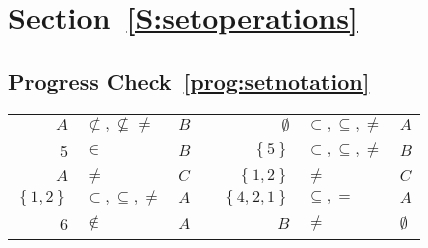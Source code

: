 \section*{Section~\ref{S:setoperations}}

\subsection*{Progress Check~\ref{prog:setnotation}}
\begin{center}
\begin{tabular}{r p{0.8in} l p{0.5in} r p{0.8in} l }
  $A$   & $\not \subset, \not \subseteq \ne$  & $B$   &   & $\emptyset$   & $\subset, \subseteq, \ne$  & $A$ \\ \cline{2-2} \cline{6-6}
   5    & $\in$  & $B$   &   &  $\left\{ 5 \right\}$     & $\subset, \subseteq, \ne$ &  $B$ \\ \cline{2-2} \cline{6-6}
  $A$   & $\ne$  & $C$   &   &  $\left\{ {1,2} \right\}$  & $\ne$  &  $C$ \\ \cline{2-2} \cline{6-6}
  $\left\{ {1,2} \right\}$ & $\subset, \subseteq, \ne$ &  $A$ &  &  $\left\{ {4,2,1} \right\}$ & 
$\subseteq, =$ & $A$ \\ \cline{2-2} \cline{6-6}
  6     & $\notin$ &  $A$ &  &  $B$  & $\ne$  & $\emptyset$ \\ \cline{2-2} \cline{6-6}
\end{tabular}
\end{center}



